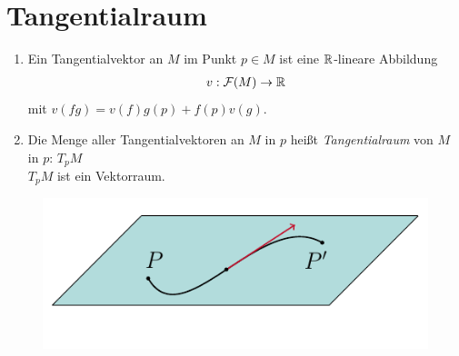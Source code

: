\section{Tangentialraum} 


\begin{defs}
\begin{enumerate}
\item Ein Tangentialvektor an $M$ im Punkt $p \in M$ ist eine $\mathbb{R}$-lineare Abbildung
\begin{align*}
v: \mathcal{F}(M) \rightarrow \mathbb{R}
\end{align*}
mit $v(fg) = v(f)g(p) + f(p)v(g)$.
\item Die Menge aller Tangentialvektoren an $M$ in $p$ heißt \textit{Tangentialraum} von $M$ in $p$: $T_pM$\\
$T_pM$ ist ein Vektorraum.
\end{enumerate}

\begin{figure}[H]
\centering
\includegraphics[scale=1]{figures/tikz/tangentline.pdf}
\end{figure}

\end{defs}
